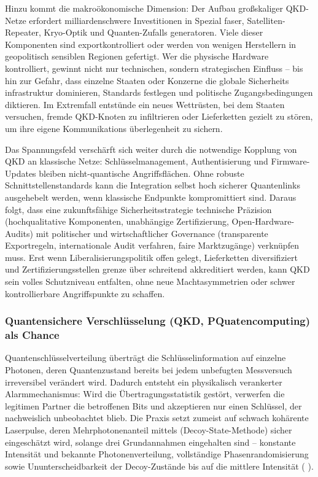 Hinzu kommt die makroökonomische Dimension: Der Aufbau großskaliger QKD-Netze erfordert milliardenschwere Investitionen in Spezial faser, Satelliten-Repeater, Kryo-Optik und Quanten-Zufalls generatoren. Viele dieser Komponenten sind exportkontrolliert oder werden von wenigen Herstellern in geopolitisch sensiblen Regionen gefertigt. Wer die physische Hardware kontrolliert, gewinnt nicht nur technischen, sondern strategischen Einfluss – bis hin zur Gefahr, dass einzelne Staaten oder Konzerne die globale Sicherheits infrastruktur dominieren, Standards festlegen und politische Zugangsbedingungen diktieren. Im Extremfall entstünde ein neues Wettrüsten, bei dem Staaten versuchen, fremde QKD-Knoten zu infiltrieren oder Lieferketten gezielt zu stören, um ihre eigene Kommunikations überlegenheit zu sichern.

Das Spannungsfeld verschärft sich weiter durch die notwendige Kopplung von QKD an klassische Netze: Schlüsselmanagement, Authentisierung und Firmware-Updates bleiben nicht-quantische Angriffsflächen. Ohne robuste Schnittstellenstandards kann die Integration selbst hoch sicherer Quantenlinks ausgehebelt werden, wenn klassische Endpunkte kompromittiert sind. Daraus folgt, dass eine zukunftsfähige Sicherheitsstrategie technische Präzision (hochqualitative Komponenten, unabhängige Zertifizierung, Open-Hardware-Audits) mit politischer und wirtschaftlicher Governance (transparente Exportregeln, internationale Audit verfahren, faire Marktzugänge) verknüpfen muss. Erst wenn Liberalisierungspolitik offen gelegt, Lieferketten diversifiziert und Zertifizierungsstellen grenze über schreitend akkreditiert werden, kann QKD sein volles Schutzniveau entfalten, ohne neue Machtasymmetrien oder schwer kontrollierbare Angriffspunkte zu schaffen. 
\cite{sunReviewSecurityEvaluation2022} 

\subsubsection{Quantensichere Verschlüsselung (QKD, PQuatencomputing) als Chance}

Quantenschlüsselverteilung überträgt die Schlüsselinformation auf einzelne Photonen, deren Quantenzustand bereits bei jedem unbefugten Messversuch irreversibel verändert wird. Dadurch entsteht ein physikalisch verankerter Alarmmechanismus: Wird die Übertragungsstatistik gestört, verwerfen die legitimen Partner die betroffenen Bits und akzeptieren nur einen Schlüssel, der nachweislich unbeobachtet blieb. Die Praxis setzt zumeist auf schwach kohärente Laserpulse, deren Mehrphotonenanteil mittels (Decoy-State-Methode) sicher eingeschätzt wird, solange drei Grundannahmen eingehalten sind – konstante Intensität und bekannte Photonenverteilung, vollständige Phasenrandomisierung sowie Ununterscheidbarkeit der Decoy-Zustände bis auf die mittlere Intensität (\cite{sunReviewSecurityEvaluation2022} ).

